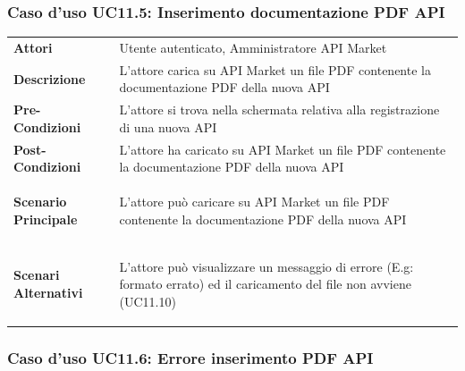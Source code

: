 \subsubsection{Caso d'uso UC11.5: Inserimento documentazione PDF API}
\label{UC11_5}

\begin{minipage}{\linewidth}
	\begin{tabular}{ l | p{11cm}}
		\hline
		\rowcolor{Gray}
		\multicolumn{2}{c}{UC11.5 - Inserimento documentazione PDF API} \\
		\hline
		\textbf{Attori} & Utente autenticato, Amministratore API Market \\
		\textbf{Descrizione} & L'attore carica su API Market un file PDF contenente la documentazione PDF della nuova API \\
		\textbf{Pre-Condizioni} & L'attore si trova nella schermata relativa alla registrazione di una nuova API \\
		\textbf{Post-Condizioni} & L'attore ha caricato su API Market un file PDF contenente la documentazione PDF della nuova API \\
		\textbf{Scenario Principale} & 
		\begin{enumerate*}[label=(\arabic*.),itemjoin={\newline}]
			\item L'attore può caricare su API Market un file PDF contenente la documentazione PDF della nuova API
		\end{enumerate*}\\
		\textbf{Scenari Alternativi} & 
		\begin{enumerate*}[label=(\arabic*.),itemjoin={\newline}]
		\item L'attore può visualizzare un messaggio di errore (E.g: formato errato) ed il caricamento del file non avviene (UC11.10)
		\end{enumerate*}\\
	\end{tabular}
\end{minipage}

\subsubsection{Caso d'uso UC11.6: Errore inserimento PDF API}
\label{UC11_6}

